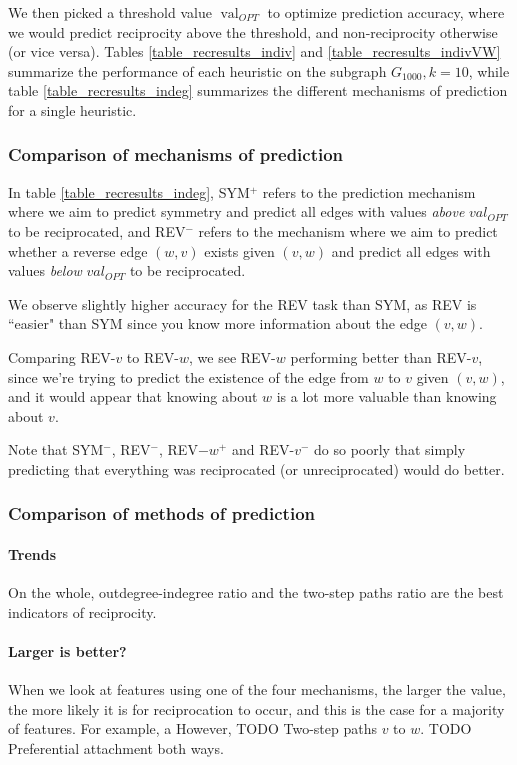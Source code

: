 \documentclass[conference]{IEEEtran}
\begin{document}
We then picked a threshold value $\operatorname{val}_{OPT}$ to optimize prediction accuracy, where we would predict reciprocity above the threshold, and non-reciprocity otherwise (or vice versa). Tables \ref{table_recresults_indiv} and \ref{table_recresults_indivVW} summarize the performance of each heuristic on the subgraph $G_{1000}, k=10$, while table \ref{table_recresults_indeg} summarizes the different mechanisms of prediction for a single heuristic. 

\subsubsection{Comparison of mechanisms of prediction}

In table \ref{table_recresults_indeg}, SYM$^+$ refers to the prediction mechanism where we aim to predict symmetry and predict all edges with values \emph{above} $val_{OPT}$ to be reciprocated, and REV$^-$ refers to the mechanism where we aim to predict whether a reverse edge $(w,v)$ exists given $(v,w)$ and predict all edges with values \emph{below} $val_{OPT}$ to be reciprocated. 

We observe slightly higher accuracy for the REV task than SYM, as REV is ``easier" than SYM since you know more information about the edge $(v,w)$.

Comparing REV-$v$ to REV-$w$, we see REV-$w$ performing better than REV-$v$, since we're trying to predict the existence of the edge from $w$ to $v$ given $(v,w)$, and it would appear that knowing about $w$ is a lot more valuable than knowing about $v$.

Note that SYM$^-$, REV$^-$, REV$-w^+$ and REV-$v^-$ do so poorly that simply predicting that everything was reciprocated (or unreciprocated) would do better.

\subsubsection{Comparison of methods of prediction}
\paragraph{Trends}
On the whole, outdegree-indegree ratio and the two-step paths ratio are the best indicators of reciprocity.

\paragraph{Larger is better?}
When we look at features using one of the four mechanisms, the larger the value, the more likely it is for reciprocation to occur, and this is the case for a majority of features. For example, a 
However,
TODO Two-step paths $v$ to $w$.
TODO Preferential attachment both ways.
\end{document}

